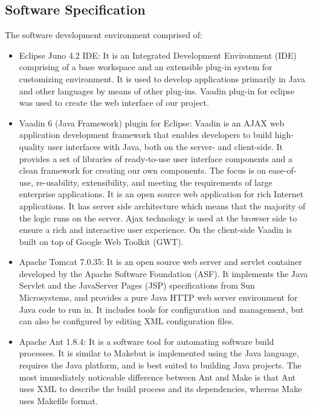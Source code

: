 \documentclass[12pt]{article}
\begin{document}
\subsection{Software Specification}
The software development environment comprised of: 
\begin{itemize}
\item Eclipse Juno 4.2 IDE:  
It is an Integrated Development Environment (IDE) comprising of a base workspace and an extensible plug-in system for customizing environment. It is used to develop applications primarily in Java and other languages by means of other plug-ins.
Vaadin plug-in for eclipse was used to create the web interface of our project.

\item Vaadin 6 (Java Framework) plugin for Eclipse:
Vaadin is an AJAX web application development framework that enables developers to build high-quality user interfaces with Java, both on the server- and client-side. It provides a set of libraries of ready-to-use user interface components and a clean framework for creating our own components. The focus is on ease-of-use, re-usability, extensibility, and meeting the requirements of large enterprise applications.
It is an open source web application for rich Internet applications. It has server side architecture which means that the majority of the logic runs on the server. Ajax technology is used at the browser side to ensure a rich and interactive user experience. On the client-side Vaadin is built on top of Google Web Toolkit (GWT).

\item Apache Tomcat 7.0.35:
It is an open source web server and servlet container developed by the Apache Software Foundation (ASF). It implements the Java Servlet and the JavaServer Pages (JSP) specifications from Sun Microsystems, and provides a pure Java HTTP web server environment for Java code to run in. It includes tools for configuration and management, but can also be configured by editing XML configuration files.

\item Apache Ant 1.8.4:
It is a software tool for automating software build processes. It is similar to \textgravedbl Make\textasciidieresis but is implemented using the Java language, requires the Java platform, and is best suited to building Java projects.
The most immediately noticeable difference between Ant and Make is that Ant uses XML to describe the build process and its dependencies, whereas Make uses Makefile format.


\end{itemize}
\end{document}
